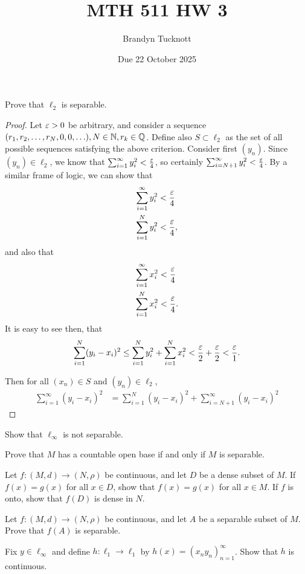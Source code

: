 \documentclass{exam}
\title{MTH 511 HW 3}
\author{Brandyn Tucknott}
\date{Due 22 October 2025}
\begin{document}
\maketitle

\begin{questions}
    \question Prove that $\ell_2$ is separable.
    \begin{proof}
        Let $\varepsilon > 0$ be arbitrary, and consider a sequence $(r_1, r_2, \hdots, r_N, 0, 0, \hdots), N\in\mathbb {N}, r_k\in\mathbb {Q}$. 
        Define also $S\subset\ell_2$ as the set of all possible sequences satisfying the above criterion. Consider first $(y_n)$.
        Since $(y_n)\in\ell_2$, we know that $\sum_{i = 1}^\infty y_i^2 < \frac{\varepsilon}{4}$, so certainly 
        $\sum_{i = N + 1}^\infty y_i^2 < \frac{\varepsilon}{4}$. By a similar frame of logic, we can show that
        \begin{align*}
            \sum_{i = 1}^\infty y_i^2 &< \frac{\varepsilon}{4} \\
            \sum_{i = 1}^N y_i^2 &< \frac{\varepsilon}{4},
        \end{align*}
        and also that
        \begin{align*}
            \sum_{i = 1}^\infty x_i^2 &< \frac{\varepsilon}{4} \\
            \sum_{i = 1}^N x_i^2 &< \frac{\varepsilon}{4}.
        \end{align*}
        It is easy to see then, that 
        $$\sum_{i = 1}^N (y_i - x_i)^2 \leq \sum_{i = 1}^N y_i^2 + \sum_{i = 1}^N x_i^2 < \frac{\varepsilon}{2} + \frac{\varepsilon}{2} < \frac{\varepsilon}{1}.$$
        
        Then for all $(x_n)\in S$
        and $(y_n)\in \ell_2$,
        \begin{align*}
            \sum_{i = 1}^\infty (y_i - x_i)^2 &= \sum_{i = 1}^N (y_i - x_i)^2 + \sum_{i = N + 1}^\infty (y_i - x_i)^2
        \end{align*}
    \end{proof}


    \newpage
    \question Show that $\ell_\infty$ is not separable.


    \newpage
    \question Prove that $M$ has a countable open base if and only if $M$ is separable.


    \newpage
    \question Let $f: (M,d)\to(N, \rho)$ be continuous, and let $D$ be a dense subset of $M$. If $f(x) = g(x)$ for all $x\in D$, 
    show that $f(x) = g(x)$ for all $x\in M$. If $f$ is onto, show that $f(D)$ is dense in $N$.


    \newpage
    \question Let $f: (M, d)\to (N, \rho)$ be continuous, and let $A$ be a separable subset of $M$. Prove that $f(A)$ is separable.


    \newpage
    \question Fix $y\in \ell_\infty$ and define $h: \ell_1\to\ell_1$ by $h(x) = (x_ny_n)_{n = 1}^\infty$. Show that $h$ is continuous.


\end{questions}
\end{document}
